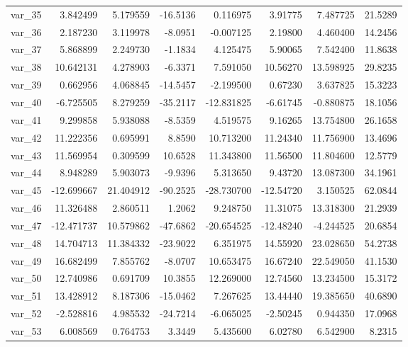 \documentclass[12pt]{article}
\begin{document}
\begin{longtable}{lrrrrrrr}
  var\_35 &   3.842499 &   5.179559 & -16.5136 &   0.116975 &   3.91775 &   7.487725 &  21.5289 \\
  var\_36 &   2.187230 &   3.119978 &  -8.0951 &  -0.007125 &   2.19800 &   4.460400 &  14.2456 \\
  var\_37 &   5.868899 &   2.249730 &  -1.1834 &   4.125475 &   5.90065 &   7.542400 &  11.8638 \\
  var\_38 &  10.642131 &   4.278903 &  -6.3371 &   7.591050 &  10.56270 &  13.598925 &  29.8235 \\
  var\_39 &   0.662956 &   4.068845 & -14.5457 &  -2.199500 &   0.67230 &   3.637825 &  15.3223 \\
  var\_40 &  -6.725505 &   8.279259 & -35.2117 & -12.831825 &  -6.61745 &  -0.880875 &  18.1056 \\
  var\_41 &   9.299858 &   5.938088 &  -8.5359 &   4.519575 &   9.16265 &  13.754800 &  26.1658 \\
  var\_42 &  11.222356 &   0.695991 &   8.8590 &  10.713200 &  11.24340 &  11.756900 &  13.4696 \\
  var\_43 &  11.569954 &   0.309599 &  10.6528 &  11.343800 &  11.56500 &  11.804600 &  12.5779 \\
  var\_44 &   8.948289 &   5.903073 &  -9.9396 &   5.313650 &   9.43720 &  13.087300 &  34.1961 \\
  var\_45 & -12.699667 &  21.404912 & -90.2525 & -28.730700 & -12.54720 &   3.150525 &  62.0844 \\
  var\_46 &  11.326488 &   2.860511 &   1.2062 &   9.248750 &  11.31075 &  13.318300 &  21.2939 \\
  var\_47 & -12.471737 &  10.579862 & -47.6862 & -20.654525 & -12.48240 &  -4.244525 &  20.6854 \\
  var\_48 &  14.704713 &  11.384332 & -23.9022 &   6.351975 &  14.55920 &  23.028650 &  54.2738 \\
  var\_49 &  16.682499 &   7.855762 &  -8.0707 &  10.653475 &  16.67240 &  22.549050 &  41.1530 \\
  var\_50 &  12.740986 &   0.691709 &  10.3855 &  12.269000 &  12.74560 &  13.234500 &  15.3172 \\
  var\_51 &  13.428912 &   8.187306 & -15.0462 &   7.267625 &  13.44440 &  19.385650 &  40.6890 \\
  var\_52 &  -2.528816 &   4.985532 & -24.7214 &  -6.065025 &  -2.50245 &   0.944350 &  17.0968 \\
  var\_53 &   6.008569 &   0.764753 &   3.3449 &   5.435600 &   6.02780 &   6.542900 &   8.2315 \\

\end{longtable}
\end{document}

